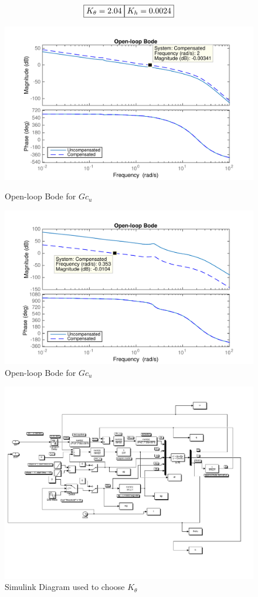 \documentclass[12pt]{article}
\begin{document}
\begin{figure}[h!]
$$
\boxed{K_{\theta} = 2.04} \\
\boxed{K_{h} = 0.0024} \\
$$
\begin{center}
\includegraphics[width=.75\textwidth]{figures/openloop_Kp_theta}
\caption{Open-loop Bode for $Gc_u$}
\includegraphics[width=.75\textwidth]{figures/openloop_Kp_h}
\caption{Open-loop Bode for $Gc_u$}
\end{center}
\end{figure}

\begin{figure}[h!]
\begin{center}
\includegraphics[width=.95\textwidth]{figures/Kp_theta_gain}
\caption{Simulink Diagram used to choose $K_{\theta}$}
\end{center}
\end{figure}
\end{document}
